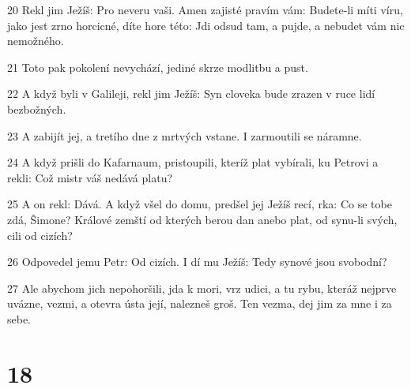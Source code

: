 \par 20 Rekl jim Ježíš: Pro neveru vaši. Amen zajisté pravím vám: Budete-li míti víru, jako jest zrno horcicné, díte hore této: Jdi odsud tam, a pujde, a nebudet vám nic nemožného.
\par 21 Toto pak pokolení nevychází, jediné skrze modlitbu a pust.
\par 22 A když byli v Galileji, rekl jim Ježíš: Syn cloveka bude zrazen v ruce lidí bezbožných.
\par 23 A zabijít jej, a tretího dne z mrtvých vstane. I zarmoutili se náramne.
\par 24 A když prišli do Kafarnaum, pristoupili, kteríž plat vybírali, ku Petrovi a rekli: Což mistr váš nedává platu?
\par 25 A on rekl: Dává. A když všel do domu, predšel jej Ježíš recí, rka: Co se tobe zdá, Šimone? Králové zemští od kterých berou dan anebo plat, od synu-li svých, cili od cizích?
\par 26 Odpovedel jemu Petr: Od cizích. I dí mu Ježíš: Tedy synové jsou svobodní?
\par 27 Ale abychom jich nepohoršili, jda k mori, vrz udici, a tu rybu, kteráž nejprve uvázne, vezmi, a otevra ústa její, nalezneš groš. Ten vezma, dej jim za mne i za sebe.

\chapter{18}

